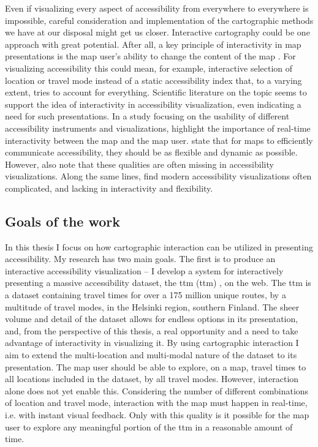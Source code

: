 Even if visualizing every aspect of accessibility
from everywhere to everywhere is impossible,
careful consideration and implementation
of the cartographic methods we have at our disposal might get us closer.
Interactive cartography could be one approach with great potential.
After all, a key principle of interactivity in map presentations is
the map user's ability to change the content of the map \parencite{rot2013b}.
For visualizing accessibility this could mean, for example,
interactive selection of location or travel mode instead of
a static accessibility index that, to a varying extent,
tries to account for everything.
Scientific literature on the topic seems to support the idea of
interactivity in accessibility visualization,
even indicating a need for such presentations.
In a study focusing on the usability of
different accessibility instruments and visualizations,  %
\textcite{te2014} highlight the importance of
real-time interactivity between the map and the map user.
\textcite{but2018} state that for maps to efficiently communicate accessibility,
they should be as flexible and dynamic as possible.
However, \textcite{but2018} also note that
these qualities are often missing in accessibility visualizations.
Along the same lines,
\textcite{paj2021} find modern accessibility visualizations often complicated,
and lacking in interactivity and flexibility.


\subsection{Goals of the work}

In this thesis I focus on
how cartographic interaction can be utilized in presenting accessibility.
My research has two main goals.
The first is to produce an interactive accessibility visualization --
I develop a system for interactively presenting a massive accessibility dataset,
the \acrlong{ttm} (\acrshort{ttm}) \parencite{fin2023},
on the web.  %
The \acrshort{ttm} is a dataset containing travel times for
over a 175 million unique routes, by a multitude of travel modes,
in the Helsinki region, southern Finland.
The sheer volume and detail of the dataset allows for endless options
in its presentation, and, from the perspective of this thesis,
a real opportunity and a need to take advantage of interactivity in visualizing it.
By using cartographic interaction
I aim to extend the multi-location and multi-modal nature of the dataset
to its presentation.
The map user should be able to explore, on a map,
travel times to all locations included in the dataset,
by all travel modes.
However, interaction alone does not yet enable this.
Considering the number of different combinations of location and travel mode,
interaction with the map must happen in real-time,
i.e. with instant visual feedback.
Only with this quality is it possible for the map user to
explore any meaningful portion of the \acrshort{ttm}
in a reasonable amount of time.

